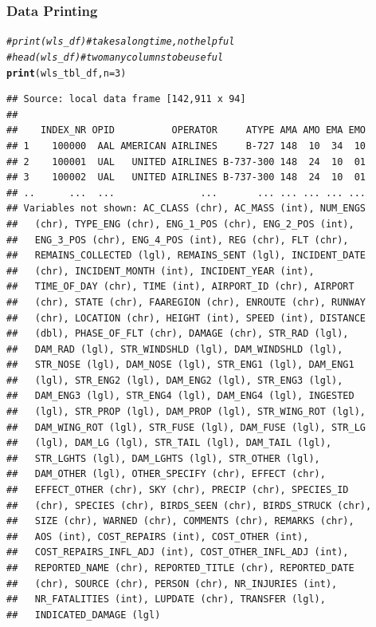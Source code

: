 \documentclass{beamer}\usepackage[]{graphicx}\usepackage[]{color}
\makeatletter
\newcommand{\hlnum}[1]{\textcolor[rgb]{0.686,0.059,0.569}{#1}}%
\newcommand{\hlcom}[1]{\textcolor[rgb]{0.678,0.584,0.686}{\textit{#1}}}%
\newcommand{\hlstd}[1]{\textcolor[rgb]{0.345,0.345,0.345}{#1}}%
\newcommand{\hlkwc}[1]{\textcolor[rgb]{0.333,0.667,0.333}{#1}}%
\newcommand{\hlkwd}[1]{\textcolor[rgb]{0.737,0.353,0.396}{\textbf{#1}}}%
\newenvironment{kframe}{%
 \def\at@end@of@kframe{}%
 \ifinner\ifhmode%
  \def\at@end@of@kframe{\end{minipage}}%
  \begin{minipage}{\columnwidth}%
 \fi\fi%
 \def\FrameCommand##1{\hskip\@totalleftmargin \hskip-\fboxsep
 \colorbox{shadecolor}{##1}\hskip-\fboxsep
     \hskip-\linewidth \hskip-\@totalleftmargin \hskip\columnwidth}%
 \MakeFramed {\advance\hsize-\width
   \@totalleftmargin\z@ \linewidth\hsize
   \@setminipage}}%
 {\par\unskip\endMakeFramed%
 \at@end@of@kframe}
\newenvironment{knitrout}{}{} %
\makeatother
\begin{document}
\begin{frame}[fragile]
  \frametitle{Data Printing}
\begin{knitrout}\footnotesize
{}\color{fgcolor}\begin{kframe}
\begin{alltt}
\hlcom{# print(wls_df)  # takes a long time, not helpful}
\hlcom{# head(wls_df)   # two many columns to be useful}
\hlkwd{print}\hlstd{(wls_tbl_df,} \hlkwc{n} \hlstd{=} \hlnum{3}\hlstd{)}
\end{alltt}
\begin{verbatim}
## Source: local data frame [142,911 x 94]
## 
##    INDEX_NR OPID          OPERATOR     ATYPE AMA AMO EMA EMO
## 1    100000  AAL AMERICAN AIRLINES     B-727 148  10  34  10
## 2    100001  UAL   UNITED AIRLINES B-737-300 148  24  10  01
## 3    100002  UAL   UNITED AIRLINES B-737-300 148  24  10  01
## ..      ...  ...               ...       ... ... ... ... ...
## Variables not shown: AC_CLASS (chr), AC_MASS (int), NUM_ENGS
##   (chr), TYPE_ENG (chr), ENG_1_POS (chr), ENG_2_POS (int),
##   ENG_3_POS (chr), ENG_4_POS (int), REG (chr), FLT (chr),
##   REMAINS_COLLECTED (lgl), REMAINS_SENT (lgl), INCIDENT_DATE
##   (chr), INCIDENT_MONTH (int), INCIDENT_YEAR (int),
##   TIME_OF_DAY (chr), TIME (int), AIRPORT_ID (chr), AIRPORT
##   (chr), STATE (chr), FAAREGION (chr), ENROUTE (chr), RUNWAY
##   (chr), LOCATION (chr), HEIGHT (int), SPEED (int), DISTANCE
##   (dbl), PHASE_OF_FLT (chr), DAMAGE (chr), STR_RAD (lgl),
##   DAM_RAD (lgl), STR_WINDSHLD (lgl), DAM_WINDSHLD (lgl),
##   STR_NOSE (lgl), DAM_NOSE (lgl), STR_ENG1 (lgl), DAM_ENG1
##   (lgl), STR_ENG2 (lgl), DAM_ENG2 (lgl), STR_ENG3 (lgl),
##   DAM_ENG3 (lgl), STR_ENG4 (lgl), DAM_ENG4 (lgl), INGESTED
##   (lgl), STR_PROP (lgl), DAM_PROP (lgl), STR_WING_ROT (lgl),
##   DAM_WING_ROT (lgl), STR_FUSE (lgl), DAM_FUSE (lgl), STR_LG
##   (lgl), DAM_LG (lgl), STR_TAIL (lgl), DAM_TAIL (lgl),
##   STR_LGHTS (lgl), DAM_LGHTS (lgl), STR_OTHER (lgl),
##   DAM_OTHER (lgl), OTHER_SPECIFY (chr), EFFECT (chr),
##   EFFECT_OTHER (chr), SKY (chr), PRECIP (chr), SPECIES_ID
##   (chr), SPECIES (chr), BIRDS_SEEN (chr), BIRDS_STRUCK (chr),
##   SIZE (chr), WARNED (chr), COMMENTS (chr), REMARKS (chr),
##   AOS (int), COST_REPAIRS (int), COST_OTHER (int),
##   COST_REPAIRS_INFL_ADJ (int), COST_OTHER_INFL_ADJ (int),
##   REPORTED_NAME (chr), REPORTED_TITLE (chr), REPORTED_DATE
##   (chr), SOURCE (chr), PERSON (chr), NR_INJURIES (int),
##   NR_FATALITIES (int), LUPDATE (chr), TRANSFER (lgl),
##   INDICATED_DAMAGE (lgl)
\end{verbatim}
\end{kframe}
\end{knitrout}
\end{frame} 
\end{document}
